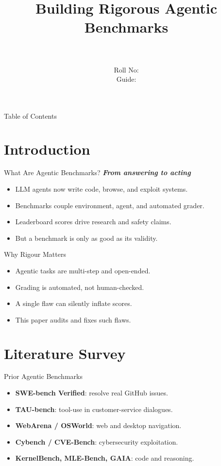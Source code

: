 \documentclass{beamer}
\title[\seminarShortTitle]{Building Rigorous Agentic Benchmarks}
\author[\seminarName\ (\seminarShortCollege)]{\seminarName \\ \seminarRoll \\ Roll No: \seminarClassRoll \\ Guide: \seminarGuide}
\institute[\seminarShortCollege]{\seminarDept \\ \seminarCollege}
\date{\seminarDate}
\begin{document}
\begin{frame}\titlepage\end{frame}
\begin{frame}{Table of Contents}\tableofcontents\end{frame}
\section{Introduction}
\begin{frame}{What Are Agentic Benchmarks?}
\textbf{\textit{From answering to acting}}
\begin{itemize}
\item LLM agents now write code, browse, and exploit systems.
\item Benchmarks couple environment, agent, and automated grader.
\item Leaderboard scores drive research and safety claims.
\item But a benchmark is only as good as its validity.
\end{itemize}
\end{frame}

\begin{frame}{Why Rigour Matters}
\begin{itemize}
\item Agentic tasks are multi-step and open-ended.
\item Grading is automated, not human-checked.
\item A single flaw can silently inflate scores.
\item This paper audits and fixes such flaws.
\end{itemize}
\end{frame}

\section{Literature Survey}
\begin{frame}{Prior Agentic Benchmarks}
\begin{itemize}
\item \textbf{SWE-bench Verified}: resolve real GitHub issues.
\item \textbf{TAU-bench}: tool-use in customer-service dialogues.
\item \textbf{WebArena / OSWorld}: web and desktop navigation.
\item \textbf{Cybench / CVE-Bench}: cybersecurity exploitation.
\item \textbf{KernelBench, MLE-Bench, GAIA}: code and reasoning.
\end{itemize}
\end{frame}
\end{document}
